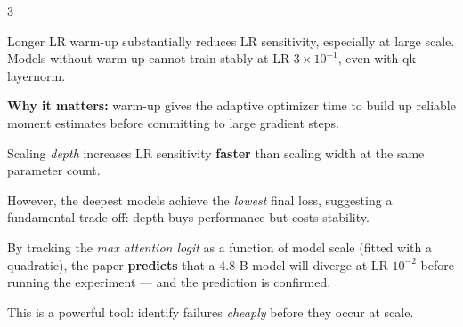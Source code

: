 \documentclass[12pt,a4paper]{article}
\begin{document}
\begin{multicols}{3}

\begin{graybox}
\small
Longer LR warm-up substantially reduces LR sensitivity, especially at large scale.
Models without warm-up cannot train stably at LR $3\times10^{-1}$, even with qk-layernorm.
\medskip

\textbf{Why it matters:} warm-up gives the adaptive optimizer time to build up reliable
moment estimates before committing to large gradient steps.
\end{graybox}

\columnbreak

\begin{graybox}
\small
Scaling \emph{depth} increases LR sensitivity \textbf{faster} than scaling width at
the same parameter count.

\medskip
However, the deepest models achieve the \emph{lowest} final loss, suggesting a
fundamental trade-off: depth buys performance but costs stability.
\end{graybox}

\columnbreak

\begin{graybox}
\small
By tracking the \emph{max attention logit} as a function of model scale (fitted
with a quadratic), the paper \textbf{predicts} that a 4.8 B model will diverge at
LR $10^{-2}$ before running the experiment — and the prediction is confirmed.

\medskip
This is a powerful tool: identify failures \emph{cheaply} before they occur at scale.
\end{graybox}

\end{multicols}



\end{document}
